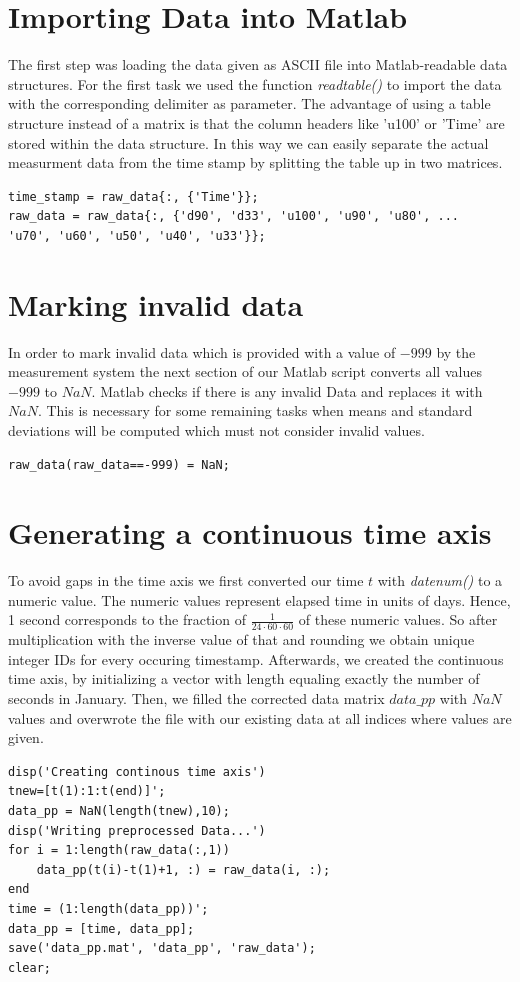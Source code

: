 \documentclass[10pt]{article}
\begin{document}
\section{Importing Data into Matlab}
The first step was loading the data given as ASCII file into Matlab-readable data structures. For the first task we used the function \textit{readtable()} to import the data with the corresponding delimiter as parameter. The advantage of using a table structure instead of a matrix is that the column headers like 'u100' or 'Time' are stored within the data structure. In this way we can easily separate the actual measurment data from the time stamp by splitting the table up in two matrices. \\
\begin{lstlisting}
time_stamp = raw_data{:, {'Time'}};
raw_data = raw_data{:, {'d90', 'd33', 'u100', 'u90', 'u80', ...
'u70', 'u60', 'u50', 'u40', 'u33'}};
\end{lstlisting}

\section{Marking invalid data}
In order to mark invalid data which is provided with a value of $-999$ by the measurement system the next section of our Matlab script converts all values $-999$ to $NaN$. Matlab checks if there is any invalid Data and replaces it with $NaN$. This is necessary for some remaining tasks when means and standard deviations will be computed which must not consider invalid values.\\
\begin{lstlisting}
raw_data(raw_data==-999) = NaN;
\end{lstlisting}

\section{Generating a continuous time axis}
To avoid gaps in the time axis we first converted our time $t$ with \textit{datenum()} to a numeric value. The numeric values represent elapsed time in units of days. Hence, 1 second corresponds to the fraction of  $\frac{1}{24\cdot60\cdot60}$ of these numeric values. So after multiplication with the inverse value of that and rounding we obtain unique integer IDs for every occuring timestamp. 
Afterwards, we created the continuous time axis, by initializing a vector with length equaling exactly the number of seconds in January. 
Then, we filled the corrected data matrix $data\_pp$ with $NaN$ values and overwrote the file with our existing data at all indices where values are given.\\
\begin{lstlisting}
disp('Creating continous time axis')
tnew=[t(1):1:t(end)]';
data_pp = NaN(length(tnew),10);
disp('Writing preprocessed Data...')
for i = 1:length(raw_data(:,1))
    data_pp(t(i)-t(1)+1, :) = raw_data(i, :);
end
time = (1:length(data_pp))';
data_pp = [time, data_pp];
save('data_pp.mat', 'data_pp', 'raw_data');
clear;
\end{lstlisting}
\end{document}
